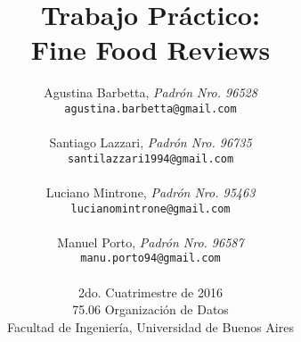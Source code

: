 \documentclass[10pt,a4paper]{article}
\begin{document}
\iffalse

\title{\textbf{Trabajo Práctico:\\  Fine Food Reviews}}

\author{Agustina Barbetta, \textit{Padrón Nro. 96528}\\
        \texttt{agustina.barbetta@gmail.com}\\\\
        Santiago Lazzari, \textit{Padrón Nro. 96735}\\
        \texttt{santilazzari1994@gmail.com}\\\\
        Luciano Mintrone, \textit{Padrón Nro. 95463}\\
        \texttt{lucianomintrone@gmail.com}\\\\
        Manuel Porto, \textit{Padrón Nro. 96587}\\
        \texttt{manu.porto94@gmail.com}\\
        \\[2.5ex]
        \normalsize{2do. Cuatrimestre de 2016}\\
        \normalsize{75.06 Organización de Datos}\\
        \normalsize{Facultad de Ingeniería, Universidad de Buenos Aires}\\
       }
\end{document}
